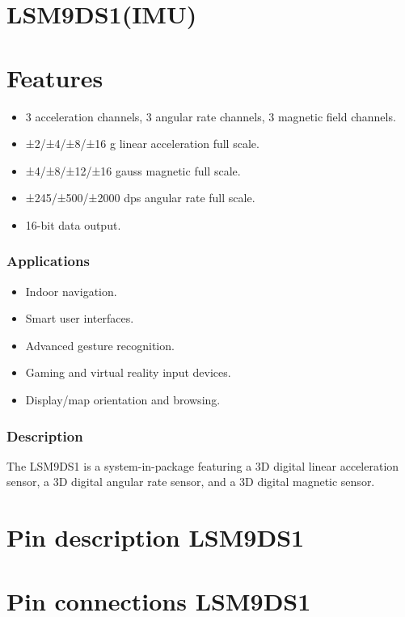 \section{LSM9DS1(IMU)}

\section{Features}

\begin{itemize}
    \item 3 acceleration channels, 3 angular rate channels, 3 magnetic field channels.
    \item ±2/±4/±8/±16 g linear acceleration full scale.
    \item ±4/±8/±12/±16 gauss magnetic full scale.
    \item ±245/±500/±2000 dps angular rate full scale.
    \item 16-bit data output.
\end{itemize}

\subsubsection{Applications}
\begin{itemize}
    \item Indoor navigation.
    \item Smart user interfaces.
    \item Advanced gesture recognition.
    \item Gaming and virtual reality input devices.
    \item Display/map orientation and browsing.
\end{itemize}

\subsubsection{Description}
The LSM9DS1 is a system-in-package featuring a 
3D digital linear acceleration sensor, a 3D digital angular rate sensor, and a 3D digital magnetic sensor.


\section{Pin description LSM9DS1}

\section{Pin connections LSM9DS1}

